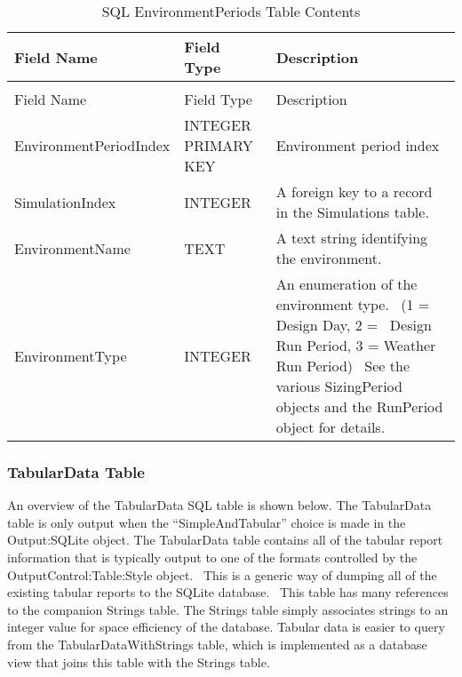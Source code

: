 \begin{longtable}[c]{p{1.5in}p{1.5in}p{3.0in}}
\caption{SQL EnvironmentPeriods Table Contents \label{table:table-37.-sql-environmentperiods-table}} \tabularnewline
\toprule 
Field Name & Field Type & Description \tabularnewline
\midrule
\endfirsthead

\caption[]{SQL EnvironmentPeriods Table Contents} \tabularnewline
\toprule 
Field Name & Field Type & Description \tabularnewline
\midrule
\endhead

EnvironmentPeriodIndex & INTEGER PRIMARY KEY & Environment period index \tabularnewline
SimulationIndex & INTEGER & A foreign key to a record in the Simulations table. \tabularnewline
EnvironmentName & TEXT & A text string identifying the environment. \tabularnewline
EnvironmentType & INTEGER & An enumeration of the environment type.~ (1 = Design Day, 2 =~ Design Run Period, 3 = Weather Run Period)~ See the various SizingPeriod objects and the RunPeriod object for details. \tabularnewline
\bottomrule
\end{longtable}

\subsubsection{TabularData Table}

An overview of the TabularData SQL table is shown below. The TabularData table is only output when the “SimpleAndTabular” choice is made in the Output:SQLite object. The TabularData table contains all of the tabular report information that is typically output to one of the formats controlled by the OutputControl:Table:Style object.  This is a generic way of dumping all of the existing tabular reports to the SQLite database.  This table has many references to the companion Strings table. The Strings table simply associates strings to an integer value for space efficiency of the database. Tabular data is easier to query from the TabularDataWithStrings table, which is implemented as a database view that joins this table with the Strings table.

